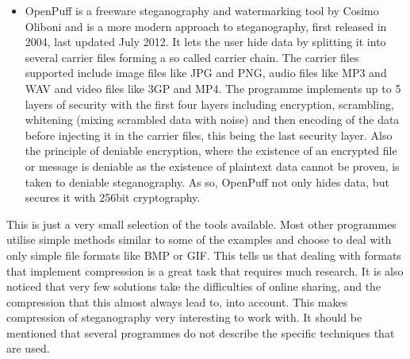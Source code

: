 \begin{itemize}
	\item OpenPuff is a freeware steganography and watermarking tool by Cosimo Oliboni and is a more modern approach to steganography, first released in 2004, last updated July 2012. 
	It lets the user hide data by splitting it into several carrier files forming a so called carrier chain. The carrier files supported include image files like JPG and PNG, audio files like MP3 and WAV and video files like 3GP and MP4.
	The programme implements up to 5 layers of security with the first four layers including encryption, scrambling, whitening (mixing scrambled data with noise) and then encoding of the data before injecting it in the carrier files, this being the last security layer\citep{Oliboni2012}. 
	Also the principle of deniable encryption, where the existence of an encrypted file or message is deniable as the existence of plaintext data cannot be proven\citep{Schneier2008}, is taken to deniable steganography. As so, OpenPuff not only hides data, but secures it with 256bit cryptography.
\end{itemize}

This is just a very small selection of the tools available. 
Most other programmes utilise simple methods similar to some of the examples and choose to deal with only simple file formats like BMP or GIF. 
This tells us that dealing with formats that implement compression is a great task that requires much research. It is also noticed that very few solutions take the difficulties of online sharing, and the compression that this almost always lead to, into account. This makes compression of steganography very interesting to work with. 
It should be mentioned that several programmes do not describe the specific techniques that are used.